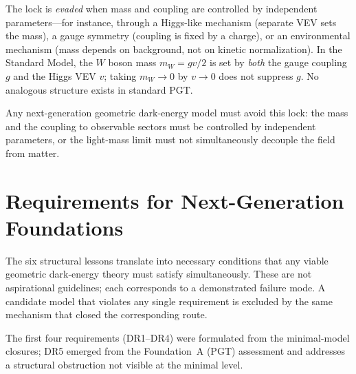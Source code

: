 \documentclass[aps,prd,twocolumn,superscriptaddress,showpacs,preprintnumbers,
  nofootinbib,longbibliography,floatfix]{revtex4-2}
\begin{document}
The lock is \textit{evaded} when mass and coupling are controlled by
independent parameters---for instance, through a Higgs-like mechanism
(separate VEV sets the mass), a gauge symmetry (coupling is fixed by a
charge), or an environmental mechanism (mass depends on background, not
on kinetic normalization). In the Standard Model, the $W$ boson mass
$m_W = gv/2$ is set by \textit{both} the gauge coupling $g$ and the
Higgs VEV $v$; taking $m_W \to 0$ by $v \to 0$ does not suppress $g$.
No analogous structure exists in standard PGT.

Any next-generation geometric dark-energy model must avoid this lock:
the mass and the coupling to observable sectors must be controlled by
independent parameters, or the light-mass limit must not simultaneously
decouple the field from matter.



\section{Requirements for Next-Generation Foundations}\label{sec:requirements}

The six structural lessons translate into necessary conditions that any
viable geometric dark-energy theory must satisfy simultaneously. These
are not aspirational guidelines; each corresponds to a demonstrated
failure mode. A candidate model that violates any single requirement is
excluded by the same mechanism that closed the corresponding route.

The first four requirements (DR1--DR4) were formulated from the
minimal-model closures; DR5 emerged from the Foundation~A (PGT)
assessment and addresses a structural obstruction not visible at the
minimal level.
\end{document}
